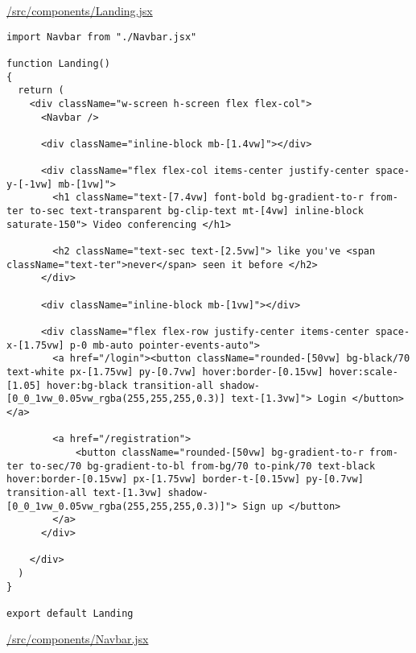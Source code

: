 \underline{/src/components/Landing.jsx}

\begin{verbatim}
import Navbar from "./Navbar.jsx"

function Landing()
{
  return (
    <div className="w-screen h-screen flex flex-col">
      <Navbar />

      <div className="inline-block mb-[1.4vw]"></div>

      <div className="flex flex-col items-center justify-center space-y-[-1vw] mb-[1vw]">
        <h1 className="text-[7.4vw] font-bold bg-gradient-to-r from-ter to-sec text-transparent bg-clip-text mt-[4vw] inline-block saturate-150"> Video conferencing </h1>

        <h2 className="text-sec text-[2.5vw]"> like you've <span className="text-ter">never</span> seen it before </h2>
      </div>

      <div className="inline-block mb-[1vw]"></div>

      <div className="flex flex-row justify-center items-center space-x-[1.75vw] p-0 mb-auto pointer-events-auto">
        <a href="/login"><button className="rounded-[50vw] bg-black/70 text-white px-[1.75vw] py-[0.7vw] hover:border-[0.15vw] hover:scale-[1.05] hover:bg-black transition-all shadow-[0_0_1vw_0.05vw_rgba(255,255,255,0.3)] text-[1.3vw]"> Login </button></a>

        <a href="/registration">
	        <button className="rounded-[50vw] bg-gradient-to-r from-ter to-sec/70 bg-gradient-to-bl from-bg/70 to-pink/70 text-black hover:border-[0.15vw] px-[1.75vw] border-t-[0.15vw] py-[0.7vw] transition-all text-[1.3vw] shadow-[0_0_1vw_0.05vw_rgba(255,255,255,0.3)]"> Sign up </button>
        </a>
      </div>

    </div>
  )
}

export default Landing
\end{verbatim}

\underline{/src/components/Navbar.jsx}

